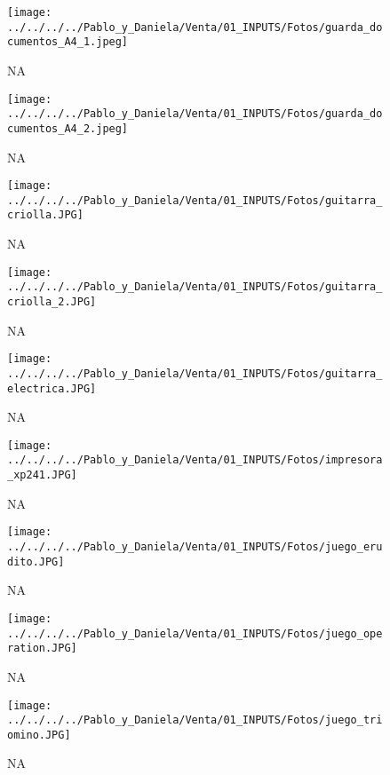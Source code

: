 \documentclass[
]{article}
\begin{document}
\pagebreak

\begin{figure}
\centering
\texttt{[image: ../../../../Pablo\_y\_Daniela/Venta/01\_INPUTS/Fotos/guarda\_documentos\_A4\_1.jpeg]}
\caption{NA}
\end{figure}

\pagebreak

\begin{figure}
\centering
\texttt{[image: ../../../../Pablo\_y\_Daniela/Venta/01\_INPUTS/Fotos/guarda\_documentos\_A4\_2.jpeg]}
\caption{NA}
\end{figure}

\pagebreak

\begin{figure}
\centering
\texttt{[image: ../../../../Pablo\_y\_Daniela/Venta/01\_INPUTS/Fotos/guitarra\_criolla.JPG]}
\caption{NA}
\end{figure}

\pagebreak

\begin{figure}
\centering
\texttt{[image: ../../../../Pablo\_y\_Daniela/Venta/01\_INPUTS/Fotos/guitarra\_criolla\_2.JPG]}
\caption{NA}
\end{figure}

\pagebreak

\begin{figure}
\centering
\texttt{[image: ../../../../Pablo\_y\_Daniela/Venta/01\_INPUTS/Fotos/guitarra\_electrica.JPG]}
\caption{NA}
\end{figure}

\pagebreak

\begin{figure}
\centering
\texttt{[image: ../../../../Pablo\_y\_Daniela/Venta/01\_INPUTS/Fotos/impresora\_xp241.JPG]}
\caption{NA}
\end{figure}

\pagebreak

\begin{figure}
\centering
\texttt{[image: ../../../../Pablo\_y\_Daniela/Venta/01\_INPUTS/Fotos/juego\_erudito.JPG]}
\caption{NA}
\end{figure}

\pagebreak

\begin{figure}
\centering
\texttt{[image: ../../../../Pablo\_y\_Daniela/Venta/01\_INPUTS/Fotos/juego\_operation.JPG]}
\caption{NA}
\end{figure}

\pagebreak

\begin{figure}
\centering
\texttt{[image: ../../../../Pablo\_y\_Daniela/Venta/01\_INPUTS/Fotos/juego\_triomino.JPG]}
\caption{NA}
\end{figure}
\end{document}

